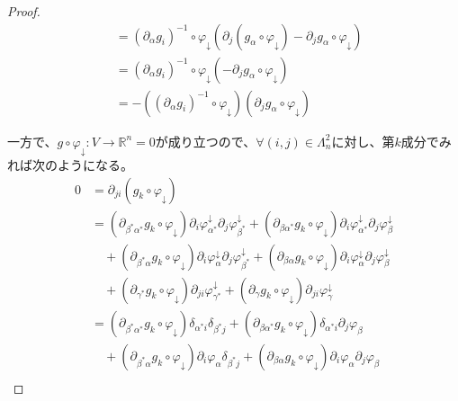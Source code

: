 \documentclass[dvipdfmx]{jsarticle}
\begin{document}
\begin{proof}
\begin{align*}
&= \left( \partial_{\alpha}g_{i} \right)^{- 1} \circ \varphi_{\downarrow}\left( \partial_{j}\left( g_{\alpha} \circ \varphi_{\downarrow} \right) - \partial_{j}g_{\alpha} \circ \varphi_{\downarrow} \right)\\
&= \left( \partial_{\alpha}g_{i} \right)^{- 1} \circ \varphi_{\downarrow}\left( - \partial_{j}g_{\alpha} \circ \varphi_{\downarrow} \right)\\
&= - \left( \left( \partial_{\alpha}g_{i} \right)^{- 1} \circ \varphi_{\downarrow} \right)\left( \partial_{j}g_{\alpha} \circ \varphi_{\downarrow} \right)
\end{align*}\par
一方で、$g \circ \varphi_{\downarrow}:V \rightarrow \mathbb{R}^{n} = 0$が成り立つので、$\forall(i,j) \in \varLambda_{n}^{2}$に対し、第$k$成分でみれば次のようになる。
\begin{align*}
0 &= \partial_{ji}\left( g_{k} \circ \varphi_{\downarrow} \right)\\
&= \left( \partial_{\beta^{*}\alpha^{*}}g_{k} \circ \varphi_{\downarrow} \right)\partial_{i}\varphi_{\alpha^{*}}^{\downarrow}\partial_{j}\varphi_{\beta^{*}}^{\downarrow} + \left( \partial_{\beta\alpha^{*}}g_{k} \circ \varphi_{\downarrow} \right)\partial_{i}\varphi_{\alpha^{*}}^{\downarrow}\partial_{j}\varphi_{\beta}^{\downarrow} \\
&\quad + \left( \partial_{\beta^{*}\alpha}g_{k} \circ \varphi_{\downarrow} \right)\partial_{i}\varphi_{\alpha}^{\downarrow}\partial_{j}\varphi_{\beta^{*}}^{\downarrow} + \left( \partial_{\beta\alpha}g_{k} \circ \varphi_{\downarrow} \right)\partial_{i}\varphi_{\alpha}^{\downarrow}\partial_{j}\varphi_{\beta}^{\downarrow} \\
&\quad + \left( \partial_{\gamma^{*}}g_{k} \circ \varphi_{\downarrow} \right)\partial_{ji}\varphi_{\gamma^{*}}^{\downarrow} + \left( \partial_{\gamma}g_{k} \circ \varphi_{\downarrow} \right)\partial_{ji}\varphi_{\gamma}^{\downarrow}\\
&= \left( \partial_{\beta^{*}\alpha^{*}}g_{k} \circ \varphi_{\downarrow} \right)\delta_{\alpha^{*}i}\delta_{\beta^{*}j} + \left( \partial_{\beta\alpha^{*}}g_{k} \circ \varphi_{\downarrow} \right)\delta_{\alpha^{*}i}\partial_{j}\varphi_{\beta} \\
&\quad + \left( \partial_{\beta^{*}\alpha}g_{k} \circ \varphi_{\downarrow} \right)\partial_{i}\varphi_{\alpha}\delta_{\beta^{*}j} + \left( \partial_{\beta\alpha}g_{k} \circ \varphi_{\downarrow} \right)\partial_{i}\varphi_{\alpha}\partial_{j}\varphi_{\beta} \\

\end{align*}
\end{proof}
\end{document}
